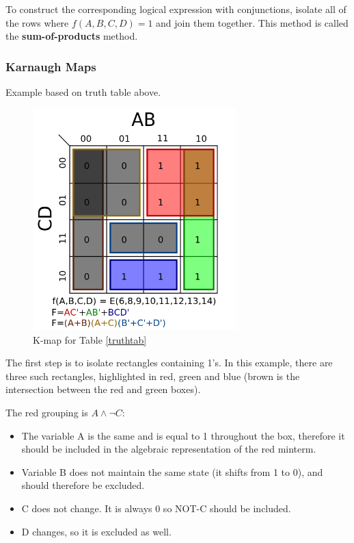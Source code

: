 \documentclass[11pt]{article}
\begin{document}
		To construct the corresponding logical expression with conjunctions, isolate all of the rows where $f(A,B,C,D) = 1$ and join them together. This method is called the \textbf{sum-of-products} method. 
		\subsubsection{Karnaugh Maps}
			Example based on truth table above.
			
			\begin{figure}[htb]
				\centering
				\includegraphics[width=0.7\textwidth]{kmap.png}
				\caption{K-map for Table \ref{truthtab}}
				\label{fig:kmap1}
			\end{figure}
			
			The first step is to isolate rectangles containing 1's. In this example, there are three such rectangles, highlighted in red, green and blue (brown is the intersection between the red and green boxes).
			
			The red grouping is $A\wedge\lnot C$:
			\begin{itemize}
				\item The variable A is the same and is equal to 1 throughout the box, therefore it should be included in the algebraic representation of the red minterm.
				\item Variable B does not maintain the same state (it shifts from 1 to 0), and should therefore be excluded.
				\item C does not change. It is always 0 so NOT-C should be included.
				\item D changes, so it is excluded as well.
			\end{itemize}
\end{document}
